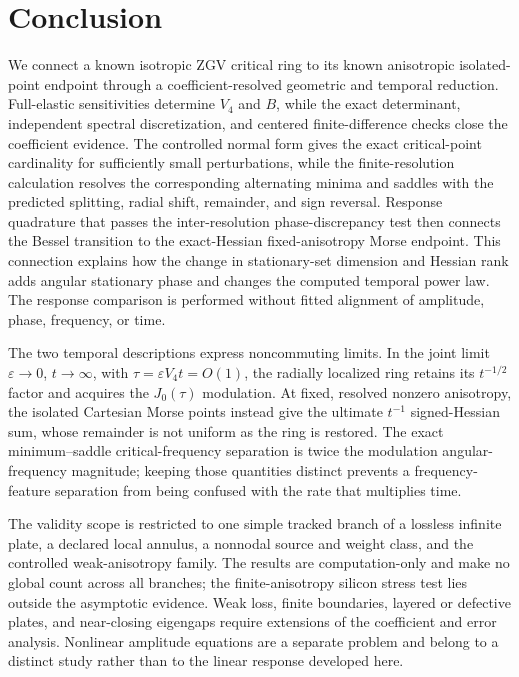 \section{Conclusion}

We connect a known isotropic ZGV critical ring to its known anisotropic
isolated-point endpoint through a coefficient-resolved geometric and temporal
reduction.  Full-elastic sensitivities determine \(V_4\) and \(B\), while the
exact determinant, independent spectral discretization, and centered
finite-difference checks close the coefficient evidence.  The controlled
normal form gives the exact critical-point cardinality for sufficiently small
perturbations, while the finite-resolution calculation resolves the corresponding alternating
minima and saddles with the predicted splitting, radial shift, remainder, and
sign reversal.  Response quadrature that passes the inter-resolution
phase-discrepancy test then connects the Bessel transition to the exact-Hessian
fixed-anisotropy Morse endpoint.  This
connection explains how the change in stationary-set dimension and Hessian rank
adds angular stationary phase and changes the computed temporal power law.  The
response comparison is performed without fitted alignment of amplitude, phase,
frequency, or time.

The two temporal descriptions express noncommuting limits.  In the joint
limit \(\varepsilon\to0\), \(t\to\infty\), with
\(\tau=\varepsilon V_4t=O(1)\), the radially localized ring retains its
\(t^{-1/2}\) factor and acquires the \(J_0(\tau)\) modulation.  At fixed,
resolved nonzero anisotropy, the isolated Cartesian Morse points instead give
the ultimate \(t^{-1}\) signed-Hessian sum, whose remainder is not uniform as
the ring is restored.  The exact minimum--saddle critical-frequency separation
is twice the modulation angular-frequency magnitude; keeping those quantities
distinct prevents a frequency-feature separation from being confused with the
rate that multiplies time.

The validity scope is restricted to one simple tracked branch of a lossless
infinite plate, a declared local annulus, a nonnodal source and weight class,
and the controlled weak-anisotropy family.  The results are computation-only
and make no global count across all branches; the finite-anisotropy silicon
stress test lies outside the asymptotic evidence.
Weak loss, finite boundaries, layered or defective plates, and near-closing
eigengaps require extensions of the coefficient and error analysis.
Nonlinear amplitude equations are a separate problem and belong to a distinct
study rather than to the linear response developed here.
